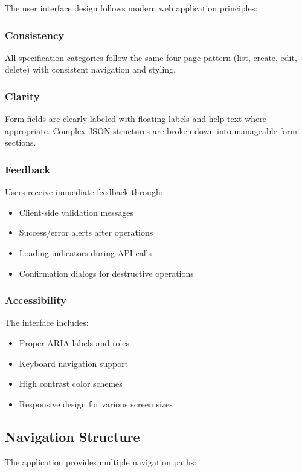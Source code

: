 \documentclass[11pt,a4paper]{article}
\begin{document}
The user interface design follows modern web application principles:

\subsubsection{Consistency}
All specification categories follow the same four-page pattern (list, create, edit, delete) with consistent navigation and styling.

\subsubsection{Clarity}
Form fields are clearly labeled with floating labels and help text where appropriate. Complex JSON structures are broken down into manageable form sections.

\subsubsection{Feedback}
Users receive immediate feedback through:
\begin{itemize}
    \item Client-side validation messages
    \item Success/error alerts after operations
    \item Loading indicators during API calls
    \item Confirmation dialogs for destructive operations
\end{itemize}

\subsubsection{Accessibility}
The interface includes:
\begin{itemize}
    \item Proper ARIA labels and roles
    \item Keyboard navigation support
    \item High contrast color schemes
    \item Responsive design for various screen sizes
\end{itemize}

\subsection{Navigation Structure}

The application provides multiple navigation paths:
\end{document}
